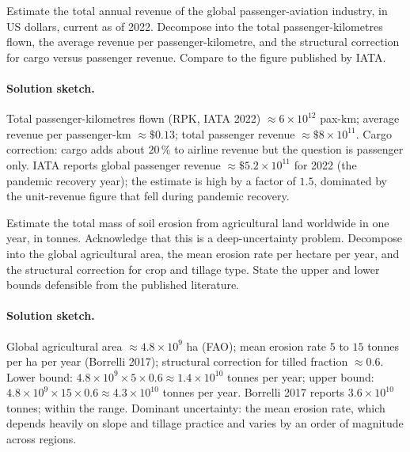 \begin{exercise}
Estimate the total annual revenue of the global passenger-aviation
industry, in US dollars, current as of 2022. Decompose into the
total passenger-kilometres flown, the average revenue per
passenger-kilometre, and the structural correction for cargo
versus passenger revenue. Compare to the figure published by IATA.
\end{exercise}

\paragraph{Solution sketch.}
Total passenger-kilometres flown (RPK, IATA 2022) $\approx 6 \times
10^{12}$ pax-km; average revenue per passenger-km $\approx \$0.13$;
total passenger revenue $\approx \$8 \times 10^{11}$. Cargo
correction: cargo adds about $20\,\%$ to airline revenue but the
question is passenger only. IATA reports global passenger revenue
$\approx \$5.2 \times 10^{11}$ for 2022 (the pandemic recovery
year); the estimate is high by a factor of $1.5$, dominated by
the unit-revenue figure that fell during pandemic recovery.

\begin{exercise}
Estimate the total mass of soil erosion from agricultural land
worldwide in one year, in tonnes. Acknowledge that this is a
deep-uncertainty problem. Decompose into the global agricultural
area, the mean erosion rate per hectare per year, and the
structural correction for crop and tillage type. State the upper
and lower bounds defensible from the published literature.
\end{exercise}

\paragraph{Solution sketch.}
Global agricultural area $\approx 4.8 \times 10^{9}$ ha (FAO);
mean erosion rate $5$ to $15$ tonnes per ha per year (Borrelli
2017); structural correction for tilled fraction $\approx 0.6$.
Lower bound: $4.8 \times 10^{9} \times 5 \times 0.6 \approx 1.4
\times 10^{10}$ tonnes per year; upper bound: $4.8 \times 10^{9}
\times 15 \times 0.6 \approx 4.3 \times 10^{10}$ tonnes per year.
Borrelli 2017 reports $3.6 \times 10^{10}$ tonnes; within the
range. Dominant uncertainty: the mean erosion rate, which depends
heavily on slope and tillage practice and varies by an order of
magnitude across regions.


